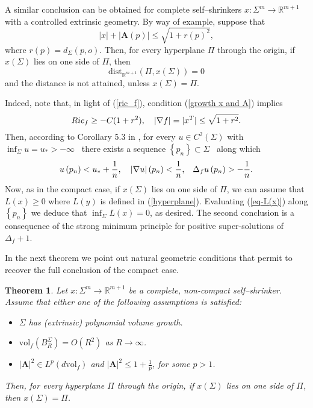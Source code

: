 \documentclass[11pt,leqno]{amsart}\usepackage{amsmath}
\newtheorem{theorem}{Theorem}
\numberwithin{equation}{section}
\begin{document}
A similar conclusion can be obtained for complete self--shrinkers  $x\colon \Sigma^{m}\rightarrow\mathbb{R}^{m+1}$
with a controlled extrinsic geometry. By way of example, suppose that
\begin{equation}
\left\vert x \right\vert + \left\vert \mathbf{A}\left(
p\right)  \right\vert \leq \sqrt{1+r\left(  p\right)^2}
,\label{growth x and A}\end{equation}
where $r\left(  p\right)  =d_{\Sigma}\left(  p,o\right)  $.
Then, for every hyperplane $\Pi$ through the origin, if $x\left(
\Sigma\right)  $ lies on one side of $\Pi$, then\[
\mathrm{dist}_{\mathbb{R}^{m+1}}\left(  \Pi,x\left(  \Sigma\right)  \right)  =0
\]
and the distance is not attained, unless $x\left(  \Sigma\right)  =\Pi$.

Indeed, note that, in light of (\ref{ric_f}),
condition (\ref{growth x and A}) implies
\[
Ric_{f}\geq-C(1+r^2)  \text{,\quad}\left\vert \nabla f\right\vert
=|x^{T}|\leq \sqrt{1+r^2}  .
\]
Then, according to Corollary 5.3 in \cite{PiRiRiSe-Annali}, for every $u\in
C^{2}\left(  \Sigma\right)  $ with $\inf_{\Sigma}u=u_{\ast}>- \infty$ \ there
exists a sequence $\left\{  p_{n}\right\}  \subset\Sigma$ \ along which\[
u\left(  p_{n}\right)  <u_{\ast}+\frac{1}{n}\text{,\quad}\left\vert \nabla
u\right\vert \left(  p_{n}\right)  <\frac{1}{n}\text{,\quad}\Delta_{f}u\left(
p_{n}\right)  >-\frac{1}{n}.
\]
Now, as in the compact case, if $x\left(  \Sigma\right)  $ lies on one side of
$\Pi$, we can assume that $L\left(  x\right)  \geq0$ where $L\left(  y\right)
$ is defined in (\ref{hyperplane}). Evaluating (\ref{eq-L(x)}) along $\left\{
p_{n}\right\}  $ we deduce that $\inf_{\Sigma}L\left(  x\right)  =0$, as
desired. The second conclusion is a consequence of the strong
minimum principle for positive super-solutions of $\Delta_{f}+1$.
\medskip

In the next theorem we point out natural geometric conditions that permit to recover the full
conclusion of the compact case.
\begin{theorem}
\label{th_halfspace-complete}
Let $x\colon \Sigma^{m}\rightarrow\mathbb{R}^{m+1}$ be
a complete, non-compact self--shrinker. Assume that either one of the following assumptions is satisfied:
\begin{itemize}
\item[(a)] $\Sigma$ has (extrinsic) polynomial volume growth.
\item[(b)] $\mathrm{vol}_f(B_R^{\Sigma})=O(R^2)$ as $R \to \infty$.
\item[(c)] $\left\vert \mathbf{A}\right\vert^2 \in L^{p} \left(
d\mathrm{vol}_{f}\right)$ and $\left\vert \mathbf{A}\right\vert ^{2}\leq 1+\frac{1}{p}$,
for some $p> 1$.
\end{itemize}
\medskip
Then, for every hyperplane $\Pi$ through the origin, if $x\left(  \Sigma\right)  $ lies on one side of $\Pi$, then $x\left(
\Sigma\right)  =\Pi$.
\end{theorem}
\end{document}
